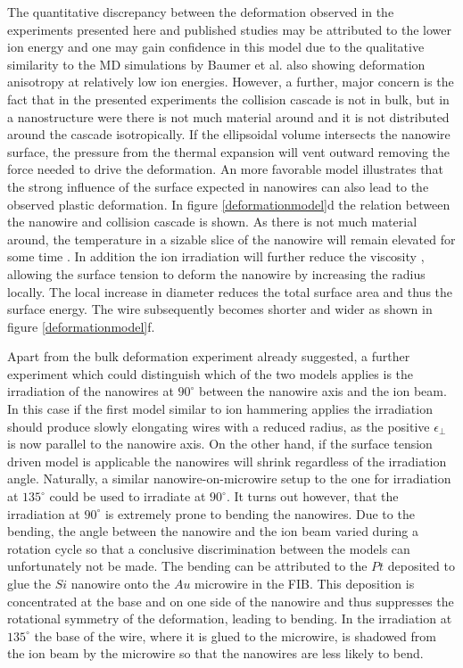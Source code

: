 The quantitative discrepancy between the deformation observed in the experiments presented here and published studies may be attributed to the lower ion energy and one may gain confidence in this model due to the qualitative similarity to the MD simulations by Baumer et al. \cite{baumer_prediction_2014} also showing deformation anisotropy at relatively low ion energies. However, a further, major concern is the fact that in the presented experiments the collision cascade is not in bulk, but in a nanostructure were there is not much material around and it is not distributed around the cascade isotropically. If the ellipsoidal volume intersects the nanowire surface, the pressure from the thermal expansion will vent outward removing the force needed to drive the deformation. An more favorable model illustrates that the strong influence of the surface expected in nanowires can also lead to the observed plastic deformation. In figure \ref{deformationmodel}d the relation between the nanowire and collision cascade is shown. As there is not much material around, the temperature in a sizable slice of the nanowire will remain elevated for some time \cite{borschel_ion-solid_2012,greaves_enhanced_2013,anders_sputtering_2015,johannes_ion_2015}. In addition the ion irradiation will further reduce the viscosity \cite{snoeks_stress_1997,hu_burrowing_2002,mayr_mechanisms_2003}, allowing the surface tension to deform the nanowire by increasing the radius locally. The local increase in diameter reduces the total surface area and thus the surface energy. The wire subsequently becomes shorter and wider as shown in figure \ref{deformationmodel}f. 

Apart from the bulk deformation experiment already suggested, a further experiment which could distinguish which of the two models applies is the irradiation of the nanowires at $90^\circ$ between the nanowire axis and the ion beam. In this case if the first model similar to ion hammering applies the irradiation should produce slowly elongating wires with a reduced radius, as the positive $\epsilon_{\perp}$ is now parallel to the nanowire axis. On the other hand, if the surface tension driven model is applicable the nanowires will shrink regardless of the irradiation angle. Naturally, a similar nanowire-on-microwire setup to the one for irradiation at $135^\circ$ could be used to irradiate at $90^\circ$. It turns out however, that the irradiation at $90^\circ$ is extremely prone to bending the nanowires. Due to the bending, the angle between the nanowire and the ion beam varied during a rotation cycle so that a conclusive discrimination between the models can unfortunately not be made. The bending can be attributed to the $Pt$ deposited to glue the $Si$ nanowire onto the $Au$ microwire in the FIB. This deposition is concentrated at the base and on one side of the nanowire and thus suppresses the rotational symmetry of the deformation, leading to bending. In the irradiation at $135^\circ$ the base of the wire, where it is glued to the microwire, is shadowed from the ion beam by the microwire so that the nanowires are less likely to bend. 
